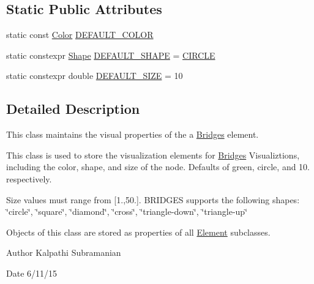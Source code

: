 \subsection*{Static Public Attributes}
\begin{DoxyCompactItemize}
\item 
static const \mbox{\hyperlink{classbridges_1_1_color}{Color}} \mbox{\hyperlink{classbridges_1_1_element_visualizer_ade224640b18e3f6eed42098ea0ad5b3a}{D\+E\+F\+A\+U\+L\+T\+\_\+\+C\+O\+L\+OR}}
\item 
static constexpr \mbox{\hyperlink{namespacebridges_a1b4050586bd708782ae0d4f3b06b9579}{Shape}} \mbox{\hyperlink{classbridges_1_1_element_visualizer_a2800a212357180e4941a818b958aabd9}{D\+E\+F\+A\+U\+L\+T\+\_\+\+S\+H\+A\+PE}} = \mbox{\hyperlink{namespacebridges_a1b4050586bd708782ae0d4f3b06b9579aa968bf0f7aeccbae1a40751345bf2e64}{C\+I\+R\+C\+LE}}
\item 
static constexpr double \mbox{\hyperlink{classbridges_1_1_element_visualizer_a81cc788d6149d5d582099cbc35e18c5a}{D\+E\+F\+A\+U\+L\+T\+\_\+\+S\+I\+ZE}} = 10
\end{DoxyCompactItemize}


\subsection{Detailed Description}
This class maintains the visual properties of the a \mbox{\hyperlink{namespacebridges_1_1_bridges}{Bridges}} element. 

This class is used to store the visualization elements for \mbox{\hyperlink{namespacebridges_1_1_bridges}{Bridges}} Visualiztions, including the color, shape, and size of the node. Defaults of green, circle, and 10. respectively.

Size values must range from \mbox{[}1.,50.\mbox{]}. B\+R\+I\+D\+G\+ES supports the following shapes\+: \char`\"{}circle\char`\"{}, \char`\"{}square\char`\"{}, \char`\"{}diamond\char`\"{}, \char`\"{}cross\char`\"{}, \char`\"{}triangle-\/down\char`\"{}, \char`\"{}triangle-\/up\char`\"{}

Objects of this class are stored as properties of all \mbox{\hyperlink{classbridges_1_1_element}{Element}} subclasses.

\begin{DoxyAuthor}{Author}
Kalpathi Subramanian 
\end{DoxyAuthor}
\begin{DoxyDate}{Date}
6/11/15 
\end{DoxyDate}


